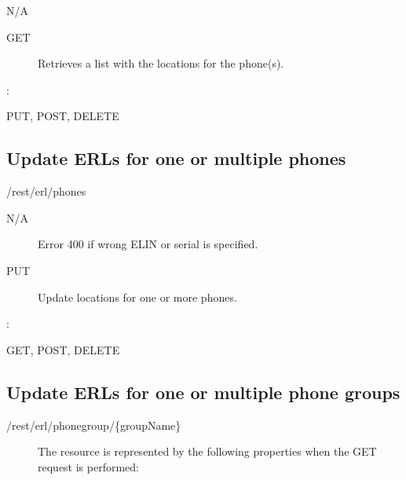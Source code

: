 \documentclass[letterpaper,10pt,english]{sphinxmanual}
\begin{document}
 N/A
\begin{description}
\item[{ GET}] \leavevmode
Retrieves a list with the locations for the phone(s).

\end{description}

:

\begin{sphinxVerbatim}[commandchars=\\\{\}]
\end{sphinxVerbatim}

 PUT, POST, DELETE


\subsection{Update ERLs for one or multiple phones}
\label{\detokenize{restapi:update-erls-for-one-or-multiple-phones}}
 /rest/erl/phones

 N/A
\begin{description}
\item[{}] \leavevmode
Error 400 if wrong ELIN or serial is specified.

\item[{ PUT}] \leavevmode
Update locations for one or more phones.

\end{description}

:

\begin{sphinxVerbatim}[commandchars=\\\{\}]
\end{sphinxVerbatim}

 GET, POST, DELETE


\subsection{Update ERLs for one or multiple phone groups}
\label{\detokenize{restapi:update-erls-for-one-or-multiple-phone-groups}}
 /rest/erl/phonegroup/\{groupName\}
\begin{description}
\item[{}] \leavevmode
The resource is represented by the following properties when the GET request is performed:

\end{description}
\end{document}
